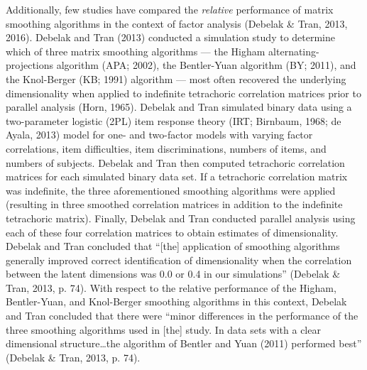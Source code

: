 \documentclass[
  english,
  man]{apa6}
\begin{document}
Additionally, few studies have compared the \emph{relative} performance of matrix smoothing algorithms in the context of factor analysis (Debelak \& Tran, 2013, 2016). Debelak and Tran (2013) conducted a simulation study to determine which of three matrix smoothing algorithms --- the Higham alternating-projections algorithm (APA; 2002), the Bentler-Yuan algorithm (BY; 2011), and the Knol-Berger (KB; 1991) algorithm --- most often recovered the underlying dimensionality when applied to indefinite tetrachoric correlation matrices prior to parallel analysis (Horn, 1965). Debelak and Tran simulated binary data using a two-parameter logistic (2PL) item response theory (IRT; Birnbaum, 1968; de Ayala, 2013) model for one- and two-factor models with varying factor correlations, item difficulties, item discriminations, numbers of items, and numbers of subjects. Debelak and Tran then computed tetrachoric correlation matrices for each simulated binary data set. If a tetrachoric correlation matrix was indefinite, the three aforementioned smoothing algorithms were applied (resulting in three smoothed correlation matrices in addition to the indefinite tetrachoric matrix). Finally, Debelak and Tran conducted parallel analysis using each of these four correlation matrices to obtain estimates of dimensionality. Debelak and Tran concluded that \enquote{{[}the{]} application of smoothing algorithms generally improved correct identification of dimensionality when the correlation between the latent dimensions was 0.0 or 0.4 in our simulations} (Debelak \& Tran, 2013, p. 74). With respect to the relative performance of the Higham, Bentler-Yuan, and Knol-Berger smoothing algorithms in this context, Debelak and Tran concluded that there were \enquote{minor differences in the performance of the three smoothing algorithms used in {[}the{]} study. In data sets with a clear dimensional structure\ldots the algorithm of Bentler and Yuan (2011) performed best} (Debelak \& Tran, 2013, p. 74).
\end{document}
